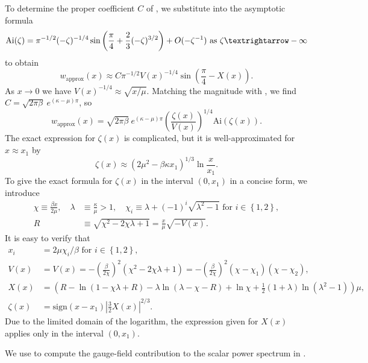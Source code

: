 To determine the proper coefficient $C$ of , we substitute into  the asymptotic formula 
\[
\mathrm{Ai}(\zeta)=\pi^{-1/2}(-\zeta)^{-1/4}\sin\left(\frac{\pi}{4}+\frac{2}{3}(-\zeta)^{3/2}\right)+O(-\zeta^{-1})\textrm{ as }\zeta\textrightarrow-\infty
\]
 to obtain 
\[
w_{\textrm{approx}}(x)\approx C\pi^{-1/2}V(x)^{-1/4}\sin\left(\frac{\pi}{4}-X(x)\right).
\]
 As $x\to0$ we have $V(x)^{-1/4}\approx\sqrt{x/\mu}$. Matching the magnitude with , we find $C=\sqrt{2\pi\beta}\ e^{(\kappa-\mu)\pi}$, so 
\begin{equation}
w_{\textrm{approx}}(x)=\sqrt{2\pi\beta}\ e^{(\kappa-\mu)\pi}\left(\frac{\zeta(x)}{V(x)}\right)^{1/4}\mathrm{Ai}\left(\zeta(x)\right).\label{eq:airy-full-approx}
\end{equation}
 The exact expression for $\zeta(x)$ is complicated, but it is well-approximated for $x\approx x_{1}$ by 
\[
\zeta(x)\approx\left(2\mu^{2}-\beta\kappa x_{1}\right)^{1/3}\ln\frac{x}{x_{1}}.
\]
 To give the exact formula for $\zeta(x)$ in the interval $\left(0,x_{1}\right)$ in a concise form, we introduce 
\begin{align*}
\chi\equiv\frac{\beta x}{2\mu},\quad\lambda & \equiv\frac{\kappa}{\mu}>1,\quad\chi_{i}\equiv\lambda+(-1)^{i}\sqrt{\lambda^{2}-1}\textrm{ for }i\in\left\{ 1,2\right\} ,\\
R & \equiv\sqrt{\chi^{2}-2\chi\lambda+1}=\frac{x}{\mu}\sqrt{-V(x)}.
\end{align*}
 It is easy to verify that 
\begin{align*}
x_{i} & =2\mu\chi_{i}/\beta\textrm{ for }i\in\left\{ 1,2\right\} ,\\
V(x) & =V(x)=-\left(\frac{\beta}{2\chi}\right)^{2}\left(\chi^{2}-2\chi\lambda+1\right)=-\left(\frac{\beta}{2\chi}\right)^{2}\left(\chi-\chi_{1}\right)\left(\chi-\chi_{2}\right),\\
X(x) & =\left(R-\ln\left(1-\chi\lambda+R\right)-\lambda\ln\left(\lambda-\chi-R\right)+\ln\chi+\tfrac{1}{2}(1+\lambda)\ln\left(\lambda^{2}-1\right)\right)\mu,\\
\zeta(x) & =\mathrm{sign}(x-x_{1})\left|\tfrac{3}{2}X(x)\right|^{2/3}.
\end{align*}
 Due to the limited domain of the logarithm, the expression given for $X(x)$ applies only in the interval $(0,x_{1})$. 

We use  to compute the gauge-field contribution to the scalar power spectrum in .

 

\textcolor{white}{}
